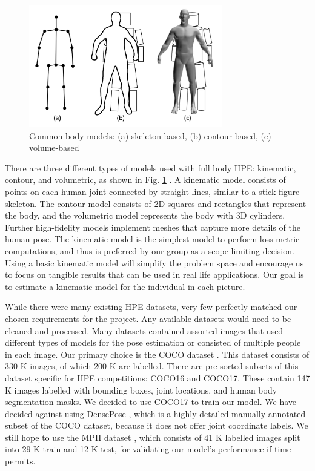 \documentclass[11pt, letterpaper]{article}
\begin{document}
\begin{figure}
    \centering
    \includegraphics[width=0.75\textwidth]{body_models.png}
    \caption{Common body models: (a) skeleton-based, (b) contour-based, (c) volume-based \cite{Chen_2020}}
    \label{fig:body_model}
\end{figure}

There are three different types of models used with full body HPE: kinematic, contour, and volumetric, as shown in Fig. \ref{fig:body_model} \cite{Chen_2020}. A kinematic model consists of points on each human joint connected by straight lines, similar to a stick-figure skeleton. The contour model consists of 2D squares and rectangles that represent the body, and the volumetric model represents the body with 3D cylinders. Further high-fidelity models implement meshes that capture more details of the human pose. The kinematic model is the simplest model to perform loss metric computations, and thus is preferred by our group as a scope-limiting decision. Using a basic kinematic model will simplify the problem space and encourage us to focus on tangible results that can be used in real life applications. Our goal is to estimate a kinematic model for the individual in each picture.

While there were many existing HPE datasets, very few perfectly matched our chosen requirements for the project. Any available datasets would need to be cleaned and processed. Many datasets contained assorted images that used different types of models for the pose estimation or consisted of multiple people in each image. Our primary choice is the COCO dataset \cite{coco_data}. This dataset consists of 330 K images, of which 200 K are labelled. There are pre-sorted subsets of this dataset specific for HPE competitions: COCO16 and COCO17. These contain 147 K images labelled with bounding boxes, joint locations, and human body segmentation masks. We decided to use COCO17 to train our model. We have decided against using DensePose \cite{densepose}, which is a highly detailed manually annotated subset of the COCO dataset, because it does not offer joint coordinate labels. We still hope to use the MPII dataset \cite{mpii}, which consists of 41 K labelled images split into 29 K train and 12 K test, for validating our model’s performance if time permits. 
\end{document}
